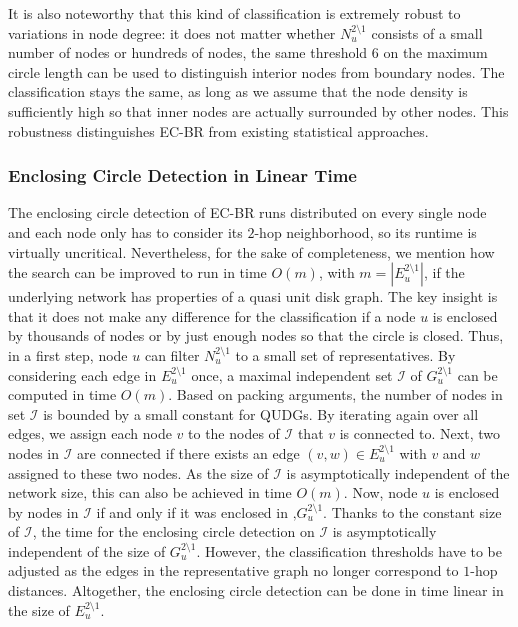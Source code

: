 \documentclass{llncs}
\begin{document}
It is also noteworthy that this kind of classification is extremely robust to variations in node degree: it does not matter whether $N_u^{2\setminus1}$ consists of a small number of nodes or hundreds of nodes, the same threshold 6 on the maximum circle length can be used to distinguish interior nodes from boundary nodes. 
The classification stays the same, as long as we assume that the node density is sufficiently high so that inner nodes are actually surrounded by other nodes.
This robustness distinguishes EC-BR from existing statistical approaches.

\subsubsection{Enclosing Circle Detection in Linear Time}
\label{ecbr_lintime}
The enclosing circle detection of EC-BR runs distributed on every single node and each node only has to consider its $2$-hop neighborhood, so its runtime is virtually uncritical.
Nevertheless, for the sake of completeness, we mention how the search can be improved to run in time $O(m)$, with $m=|E_u^{2\setminus1}|$, if the underlying network has properties of a quasi unit disk graph.
The key insight is that it does not make any difference for the classification if a node $u$ is enclosed by thousands of nodes or by just enough nodes so that the circle is closed.
Thus, in a first step, node $u$ can filter $N_u^{2\setminus1}$ to a small set of representatives.
By considering each edge in $E_u^{2\setminus1}$ once, a maximal independent set $\mathcal{I}$ of $G_u^{2\setminus1}$ can be computed in time $O(m)$.
Based on packing arguments, the number of nodes in set $\mathcal{I}$ is bounded by a small constant for QUDGs.
By iterating again over all edges, we assign each node $v$ to the nodes of $\mathcal{I}$ that $v$ is connected to.
Next, two nodes in $\mathcal{I}$ are connected if there exists an edge $(v,w) \in E_u^{2\setminus1}$ with $v$ and $w$ assigned to these two nodes.
As the size of $\mathcal{I}$ is asymptotically independent of the network size, this can also be achieved in time $O(m)$.
Now, node $u$ is enclosed by nodes in $\mathcal{I}$ if and only if it was enclosed in $‚G_u^{2\setminus1}$.
Thanks to the constant size of $\mathcal{I}$, the time for the enclosing circle detection on $\mathcal{I}$ is asymptotically independent of the size of $G_u^{2\setminus1}$.
However, the classification thresholds have to be adjusted as the edges in the representative graph no longer correspond to $1$-hop distances.
Altogether, the enclosing circle detection can be done in time linear in the size of $E_u^{2\setminus1}$.
\end{document}
